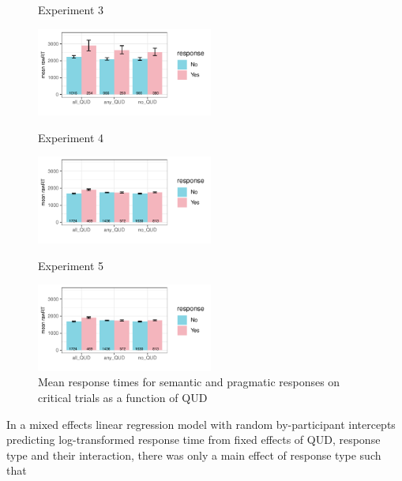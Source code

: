 \documentclass[12pt]{article}
\begin{document}
\begin{figure}[!ht] 
    \begin{minipage}{.32\textwidth}
        \caption*{Experiment 3}
        \includegraphics[height=2.9cm]{img/exp3_response_time.pdf}
    \end{minipage}%
    \begin{minipage}{.32\textwidth}
        \caption*{Experiment 4}
        \includegraphics[height=2.9cm]{img/exp4_response_time.pdf}
    \end{minipage}%
    \begin{minipage}{.32\textwidth}
        \caption*{Experiment 5}
        \includegraphics[height=2.9cm]{img/exp4_response_time.pdf}
    \end{minipage}%
    \caption{Mean response times for semantic and pragmatic responses on critical trials as a function of QUD}
\end{figure}

In a mixed effects linear regression model with random by-participant intercepts predicting log-transformed response time from fixed effects of QUD, response type and their interaction, there was only a main effect of response type such that 
\end{document}
